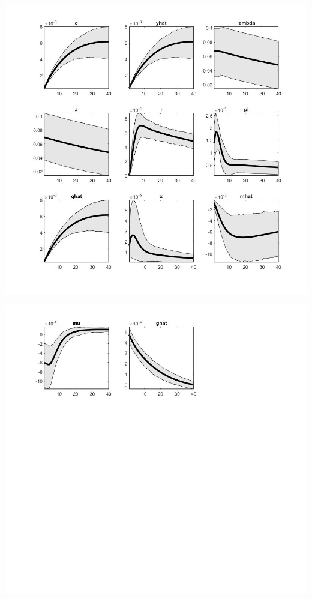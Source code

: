 \documentclass[11pt,preprint, authoryear]{elsarticle}
\let\origfigure\figure
\let\endorigfigure\endfigure
\renewenvironment{figure}[1][2] {
    \expandafter\origfigure\expandafter[H]
} {
    \endorigfigure
}
\numberwithin{equation}{section}
\numberwithin{figure}{section}
\numberwithin{table}{section}
\begin{document}
\begin{figure}
    \centering 
    \begin{minipage}[t]{8.2cm} 
        \centering 
        \includegraphics[width=\linewidth]{tay_a1.jpg} 
    \end{minipage} 
    \hspace{0.1cm} 
    \begin{minipage}[t]{8.2cm} 
        \centering 
        \includegraphics[width=\linewidth]{tay_a2.jpg} 
    \end{minipage}
    \caption{Orthogonalized Shock to Preference Shock - Taylor Rule}
    \label{tay_a}
\end{figure}
\end{document}
